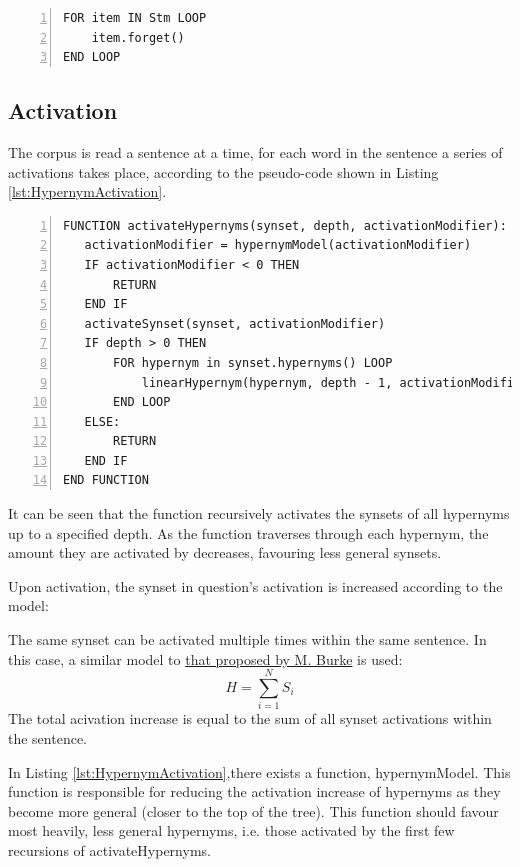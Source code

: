 \documentclass[]{article}
\begin{document}
\begin{lstlisting}[numbers=left, numberstyle=\small, caption={Forget loop}, captionpos=b, label={lst:ForgetLoop}]
FOR item IN Stm LOOP
	item.forget()
END LOOP
\end{lstlisting}

\subsection{Activation}
\label{sec:activation} 

The corpus is read a sentence at a time, for each word in the sentence a series of activations takes place, according to the pseudo-code shown in Listing \ref{lst:HypernymActivation}.


\begin{lstlisting}[numbers=left, numberstyle=\small, caption={Hypernym Activation}, captionpos=b, label={lst:HypernymActivation}]
FUNCTION activateHypernyms(synset, depth, activationModifier):
   activationModifier = hypernymModel(activationModifier)
   IF activationModifier < 0 THEN
       RETURN
   END IF
   activateSynset(synset, activationModifier)
   IF depth > 0 THEN
       FOR hypernym in synset.hypernyms() LOOP
           linearHypernym(hypernym, depth - 1, activationModifier)
       END LOOP
   ELSE:
       RETURN
   END IF
END FUNCTION
\end{lstlisting}

It can be seen that the function recursively activates the synsets of all hypernyms up to a specified depth. As the function traverses through each hypernym, the amount they are activated by decreases, favouring less general synsets.

Upon activation, the synset in question's activation is increased according to the model:

The same synset can be activated multiple times within the same sentence. In this case, a similar model to \hyperref[sec:MattBurke]{that proposed by M. Burke} \cite{MattBurkePrevious} is used: 
\[H = \sum\limits_{i=1}^N S_i\] 
The total acivation increase is equal to the sum of all synset activations within the sentence. 

In Listing \ref{lst:HypernymActivation},there exists a function, hypernymModel. This function is responsible for reducing the activation increase of hypernyms as they become more general (closer to the top of the tree). This function should favour most heavily, less general hypernyms, i.e. those activated by the first few recursions of activateHypernyms. 
\end{document}
